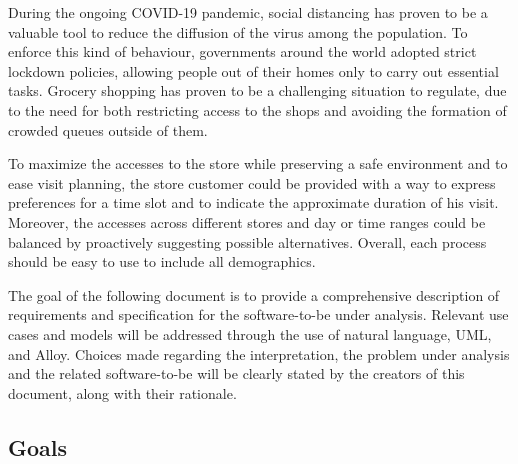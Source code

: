 \documentclass[../../main.tex]{subfiles}
\begin{document}
During the ongoing COVID-19 pandemic, social distancing has proven to be a valuable tool to reduce the diffusion of the virus among the population. To enforce this kind of behaviour,
governments around the world adopted strict lockdown policies, allowing people out of their homes only to carry out essential tasks.
Grocery shopping has proven to be a challenging situation to regulate, due to the need for both restricting access to the shops and 
avoiding the formation of crowded queues outside of them.

To maximize the accesses to the store while preserving a safe environment and to ease visit planning, the store customer could be provided with a way to express preferences for a time slot 
and to indicate the approximate duration of his visit.
Moreover, the accesses across different stores and day or time ranges could be balanced by proactively suggesting possible alternatives.
Overall, each process should be easy to use to include all demographics.

The goal of the following document is to provide a comprehensive description of requirements and specification for the software-to-be under analysis. 
Relevant use cases and models will be addressed through the use of natural language, UML, and Alloy. 
Choices made regarding the interpretation, the problem under analysis and the related software-to-be will be clearly stated by the creators of this document, along with their rationale.

\subsection{Goals}

\end{document}
